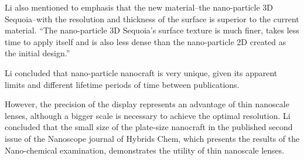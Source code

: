 \documentclass{article}
\begin{document}
Li also mentioned to emphasis that the new material–the nano-particle 3D Sequoia–with the resolution and thickness of the surface is superior to the current material. “The nano-particle 3D Sequoia’s surface texture is much finer, takes less time to apply itself and is also less dense than the nano-particle 2D created as the initial design.”

Li concluded that nano-particle nanocraft is very unique, given its apparent limits and different lifetime periods of time between publications.

However, the precision of the display represents an advantage of thin nanoscale lenses, although a bigger scale is necessary to achieve the optimal resolution. Li concluded that the small size of the plate-size nanocraft in the published second issue of the Nanoscope journal of Hybrids Chem, which presents the results of the Nano-chemical examination, demonstrates the utility of thin nanoscale lenses.
\end{document}
